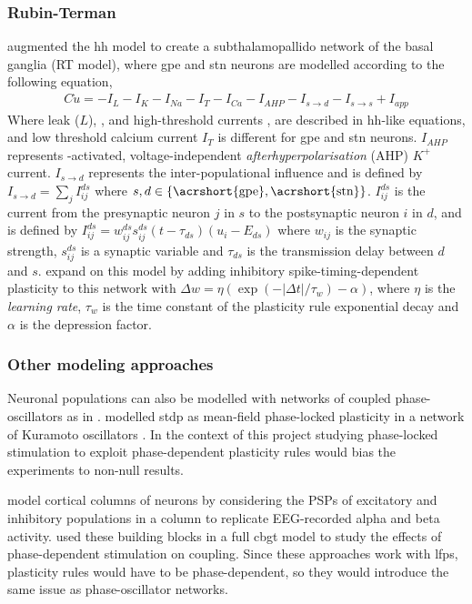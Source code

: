 \subsubsection{Rubin-Terman}
\cite{terman2002activity} augmented the \acrshort{hh} model to create a subthalamopallido network of the
basal ganglia (RT model), where \acrshort{gpe} and \acrshort{stn} neurons are modelled according to the following equation,
\begin{align}
	C \dot u = - I_L - I_K - I_{Na} - I_T - I_{Ca} - I_{AHP} - I_{s \rightarrow d} -
	I_{s \rightarrow s} + I_{app}
\end{align}
Where leak ($L$), \K, \Na and high-threshold \Ca currents \cite{song2000characterization}, are
described in \acrshort{hh}-like equations, and low threshold calcium current $I_T$ is different for \acrshort{gpe} and
\acrshort{stn} neurons. $I_{AHP}$ represents \Ca-activated, voltage-independent \textit{afterhyperpolarisation}
(AHP) $K^+$ current. $I_{s \rightarrow d}$ represents the inter-populational influence and is
defined by
$I_{s \rightarrow d} = \sum_{j} I_{ij}^{ds}$ where $s, d \in \{\text{\acrshort{gpe}}, \text{\acrshort{stn}}\}$.
$I_{ij}^{ds}$ is the current from the presynaptic neuron $j$ in $s$ to the
postsynaptic neuron $i$ in $d$, and is defined by
$I_{ij}^{ds} = w_{ij}^{ds}s_{ij}^{ds}(t - \tau_{ds})(u_i - E_{ds})$ where $w_{ij}$ is the
synaptic strength, $s_{ij}^{ds}$ is a synaptic variable and $\tau_{ds}$ is the transmission
delay between $d$ and $s$.
\cite{madadi2022inhibitory} expand on this model by adding inhibitory spike-timing-dependent
plasticity to this network with $\Delta w = \eta(\exp(-|\Delta t| / \tau_w) - \alpha)$,
where $\eta$ is the \textit{learning rate}, $\tau_w$ is the time constant of the plasticity
rule exponential decay and $\alpha$ is the depression factor.

\subsubsection{Other modeling approaches}
Neuronal populations can also be modelled with networks of coupled phase-oscillators as in
\cite{tass2006long}. \cite{duchet2023mean} modelled \acrshort{stdp} as mean-field phase-locked plasticity in a network of
Kuramoto oscillators \cite{kuramoto1984phase}. In the context of this project studying phase-locked stimulation
to exploit phase-dependent plasticity rules would bias the experiments to non-null results.

\cite{jansen1995electroencephalogram} model cortical columns of neurons by considering the PSPs of
excitatory and inhibitory populations in a column to replicate EEG-recorded alpha and beta activity.
\cite{west2022stimulating} used these building blocks in a full \acrshort{cbgt} model to study the effects of
phase-dependent stimulation on coupling. Since these approaches work with \acrshort{lfp}s, plasticity
rules would have to be phase-dependent, so they would introduce the same issue as phase-oscillator networks.

